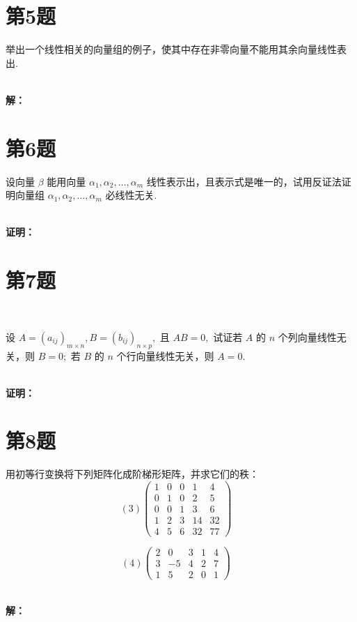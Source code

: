 \documentclass[a4paper, 12pt]{ctexart}
\begin{document}
\section{第5题}
\begin{exercise}
举出一个线性相关的向量组的例子，使其中存在非零向量不能用其余向量线性表出.
\end{exercise}~\\
\noindent\textbf{解：}\\

\section{第6题}
\begin{exercise}
设向量 $\beta$ 能用向量 $\alpha_1, \alpha_2, \ldots, \alpha_m$ 线性表示出，且表示式是唯一的，试用反证法证明向量组 $\alpha_1, \alpha_2, \ldots, \alpha_m$ 必线性无关.\\

\end{exercise}~\\
\noindent\textbf{证明：}\\

 

\section{第7题}~\\

\begin{exercise}
设 $A = (a_{ij})_{m \times n}, B = (b_{ij})_{n \times p},$ 且 $AB = 0,$ 试证若 $A$ 的 $n$ 个列向量线性无关，则 $B = 0;$ 若 $B$ 的 $n$ 个行向量线性无关，则 $A = 0.$\\

\end{exercise}~\\

\noindent\textbf{证明：}


\section{第8题}
\begin{exercise}
用初等行变换将下列矩阵化成阶梯形矩阵，并求它们的秩：
\[
(3)\begin{pmatrix}
1 & 0 & 0 & 1 & 4 \\
0 & 1 & 0 & 2 & 5 \\
0 & 0 & 1 & 3 & 6 \\
1 & 2 & 3 & 14 & 32 \\
4 & 5 & 6 & 32 & 77
\end{pmatrix} \quad 
\]

\[
(4)\begin{pmatrix}
2 & 0 & 3 & 1 & 4 \\
3 & -5 & 4 & 2 & 7 \\
1 & 5 & 2 & 0 & 1
\end{pmatrix} \quad 
\]
\end{exercise}~\\
\noindent\textbf{解：}\\
\end{document}
